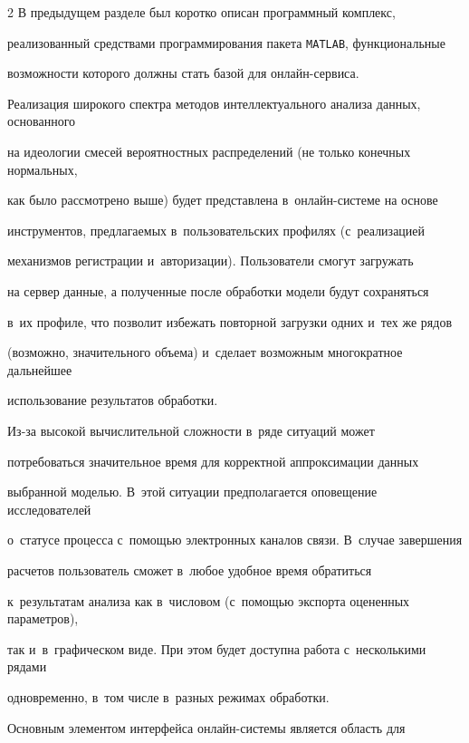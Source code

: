 \begin{multicols}{2}
В предыдущем разделе был коротко описан программный комплекс, 

реализованный средствами программирования пакета \verb"MATLAB", функциональные 

возможности которого должны стать базой для он\-лайн-сер\-виса.



Реализация широкого спектра методов интеллектуального анализа данных, основанного 

на идеологии смесей вероятностных распределений (не только конечных нормальных, 

как было рас\-смот\-ре\-но выше) будет представлена в~он\-лайн-сис\-те\-ме на основе 

инструментов, предлагаемых в~пользовательских профилях (с~реализацией  

механизмов регистрации и~авторизации). Пользователи смогут загружать 

на сервер данные, а полученные после обработки модели будут сохраняться 

в~их профиле, что позволит избежать повторной загрузки одних и~тех же рядов 

(возможно, значительного объема) и~сделает возможным многократное дальнейшее 

использование результатов обработки.



Из-за высокой вычислительной сложности в~ряде ситуаций может 

потребоваться значительное время для корректной аппроксимации данных 

выбранной моделью. В~этой ситуации предполагается оповещение исследователей 

о~статусе процесса с~по\-мощью электронных каналов связи. В~случае завершения 

расчетов пользователь сможет в~любое удобное время обратиться 

к~результатам анализа как в~числовом (с~по\-мощью экспорта оцененных параметров), 

так и~в~графическом виде. При этом будет доступна работа с~несколькими рядами 

одновременно, в~том числе в~разных режимах обработки.













Основным элементом интерфейса он\-лайн-сис\-те\-мы является область для


\end{multicols}
